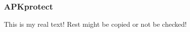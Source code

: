 \subsubsection{APKprotect} \label{subsubsection:evaluation-reengineering-propack-apkprotect}
This is my real text! Rest might be copied or not be checked!
